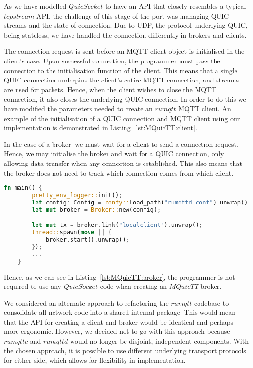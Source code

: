 As we have modelled $QuicSocket$ to have an API that closely resembles a typical $tcpstream$ API, the challenge of this stage of the port was managing QUIC streams and the state of connection.
Due to UDP, the protocol underlying QUIC, being stateless, we have handled the connection differently in brokers and clients.

The connection request is sent before an MQTT client object is initialised in the client's case.
Upon successful connection, the programmer must pass the connection to the initialisation function of the client.
This means that a single QUIC connection underpins the client's entire MQTT connection, and streams are used for packets.
Hence, when the client wishes to close the MQTT connection, it also closes the underlying QUIC connection.
In order to do this we have modified the parameters needed to create an $rumqtt$ MQTT client.
An example of the initialisation of a QUIC connection and MQTT client using our implementation is demonstrated in Listing~\ref{lst:MQuicTT:client}.

In the case of a broker, we must wait for a client to send a connection request.
Hence, we may initialise the broker and wait for a QUIC connection, only allowing data transfer when any connection is established.
This also means that the broker does not need to track which connection comes from which client.

\begin{lstlisting}[language=Rust, caption={An example of initialising an MQuicTT broker. We can see that no operations with $QuiSocket$ are required for this initialisation as all QUIC operations are handled internally.}, label=lst:MQuicTT:broker]
    fn main() {
        pretty_env_logger::init();
        let config: Config = confy::load_path("rumqttd.conf").unwrap();
        let mut broker = Broker::new(config);

        let mut tx = broker.link("localclient").unwrap();
        thread::spawn(move || {
            broker.start().unwrap();
        });
        ...
    }

\end{lstlisting}

Hence, as we can see in Listing~\ref{lst:MQuicTT:broker}, the programmer is not required to use any $QuicSocket$ code when creating an $MQuicTT$ broker.

We considered an alternate approach to refactoring the $rumqtt$ codebase to consolidate all network code into a shared internal package.
This would mean that the API for creating a client and broker would be identical and perhaps more ergonomic.
However, we decided not to go with this approach because $rumqttc$ and $rumqttd$ would no longer be disjoint, independent components.
With the chosen approach, it is possible to use different underlying transport protocols for either side, which allows for flexibility in implementation.


